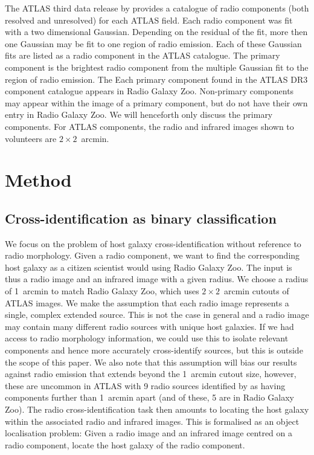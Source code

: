 \documentclass[fleqn,usenatbib,usedcolumn]{mnras}
\begin{document}
    The ATLAS third data release by \citet{franzen15} provides a catalogue of radio components (both resolved and unresolved) for each ATLAS field.  Each radio component was fit with a two dimensional Gaussian. Depending on the residual of the fit, more then one Gaussian may be fit to one region of radio emission.  Each of these Gaussian fits are listed as a radio component in the ATLAS catalogue.  The primary component is the brightest radio component from the multiple Gaussian fit to the region of radio emission. The Each primary
    component found in the ATLAS DR3 component catalogue appears in Radio Galaxy
    Zoo. Non-primary components may appear within the image of a primary
    component, but do not have their own entry in Radio Galaxy Zoo. We will
    henceforth only discuss the primary components. For ATLAS components, the
    radio and infrared images shown to volunteers are $2 \times 2$~arcmin.

  \section{Method}\label{sec:method}

  \subsection{Cross-identification as binary
  classification}\label{cross-identification-as-binary-classification}

    We focus on the problem of host galaxy cross-identification without
    reference to radio morphology. Given a radio component, we want to find the
    corresponding host galaxy as a citizen scientist would using Radio Galaxy
    Zoo. The input is thus a radio image and an infrared image with a given
    radius. We choose a radius of 1~arcmin to match Radio Galaxy Zoo, which uses
    $2 \times 2$~arcmin cutouts of ATLAS images. We make the assumption that
    each radio image represents a single, complex extended source. This is not
    the case in general and a radio image may contain many different radio
    sources with unique host galaxies. If we had access to radio morphology
    information, we could use this to isolate relevant components and hence more
    accurately cross-identify sources, but this is outside the scope of this
    paper. We also note that this assumption will bias our results against radio
    emission that extends beyond the 1~arcmin cutout size, however, these are
    uncommon in ATLAS with 9 radio sources identified by \citet{norris06} as
    having components further than 1~arcmin apart (and of these, 5 are in Radio
    Galaxy Zoo). The radio cross-identification task then amounts to locating
    the host galaxy within the associated radio and infrared images. This is
    formalised as an object localisation problem: Given a radio image and an
    infrared image centred on a radio component, locate the host galaxy of the
    radio component.    %
\end{document}
